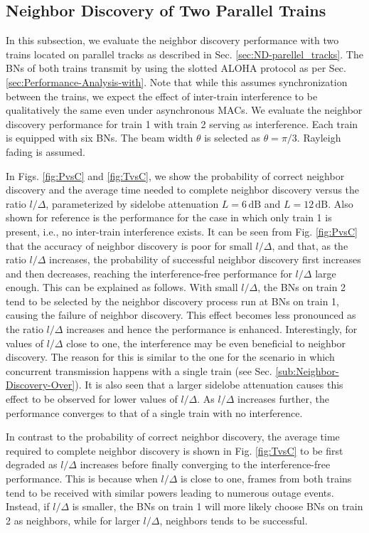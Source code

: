 \documentclass[10pt,english,two column]{IEEEtran}
\begin{document}
\subsection{Neighbor Discovery of Two Parallel Trains}

In this subsection, we evaluate the neighbor discovery performance
with two trains located on parallel tracks as described in Sec. \ref{sec:ND-parellel_tracks}.
The BNs of both trains transmit by using the slotted ALOHA protocol
as per Sec. \ref{sec:Performance-Analysis-with}. Note that while
this assumes synchronization between the trains, we expect the effect
of inter-train interference to be qualitatively the same even under
asynchronous MACs. We evaluate the neighbor discovery performance
for train 1 with train 2 serving as interference. Each train is equipped
with six BNs. The beam width $\theta$ is selected as $\theta=\pi/3$.
Rayleigh fading is assumed. 

In Figs. \ref{fig:PvsC} and \ref{fig:TvsC}, we show the probability
of correct neighbor discovery and the average time needed to complete
neighbor discovery versus the ratio $l/\Delta$, parameterized by
sidelobe attenuation $L=6\,\mathrm{d\mathrm{B}}$ and $L=12\,\mathrm{dB}$.
Also shown for reference is the performance for the case in which
only train 1 is present, i.e., no inter-train interference exists.
It can be seen from Fig. \ref{fig:PvsC} that the accuracy of neighbor
discovery is poor for small $l/\Delta$, and that, as the ratio $l/\Delta$
increases, the probability of successful neighbor discovery first
increases and then decreases, reaching the interference-free performance
for $l/\Delta$ large enough. This can be explained as follows. With
small $l/\Delta$, the BNs on train 2 tend to be selected by the neighbor
discovery process run at BNs on train 1, causing the failure of neighbor
discovery. This effect becomes less pronounced as the ratio $l/\Delta$
increases and hence the performance is enhanced. Interestingly, for
values of $l/\Delta$ close to one, the interference may be even beneficial
to neighbor discovery. The reason for this is similar to the one for
the scenario in which concurrent transmission happens with a single
train (see Sec. \ref{sub:Neighbor-Discovery-Over}). It is also seen
that a larger sidelobe attenuation causes this effect to be observed
for lower values of $l/\Delta$. As $l/\Delta$ increases further,
the performance converges to that of a single train with no interference. 

In contrast to the probability of correct neighbor discovery, the
average time required to complete neighbor discovery is shown in Fig.
\ref{fig:TvsC} to be first degraded as $l/\Delta$ increases before
finally converging to the interference-free performance. This is because
when $l/\Delta$ is close to one, frames from both trains tend to
be received with similar powers leading to numerous outage events.
Instead, if $l/\Delta$ is smaller, the BNs on train 1 will more likely
choose BNs on train 2 as neighbors, while for larger $l/\Delta$,
neighbors tends to be successful.
\end{document}

